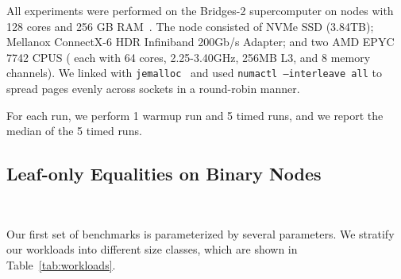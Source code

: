 All experiments were performed on the Bridges-2 supercomputer on nodes with 128
cores and 256 GB RAM~\cite{bridges}. The node consisted of NVMe SSD (3.84TB);
Mellanox ConnectX-6 HDR Infiniband 200Gb/s Adapter; and two AMD EPYC 7742 CPUS (
each with 64 cores, 2.25-3.40GHz, 256MB L3, and 8 memory channels). We linked
with \texttt{jemalloc}~\cite{jemalloc} and used \texttt{numactl --interleave all} to spread
pages evenly across sockets in a round-robin manner.

For each run, we perform 1 warmup run and 5 timed runs, and we report the median of the 5 timed runs.

\subsection{Leaf-only Equalities on Binary Nodes}~\label{sec:eval:random}

Our first set of benchmarks is parameterized by several parameters.
We stratify our workloads into
different size classes, which are shown in Table~\ref{tab:workloads}.

